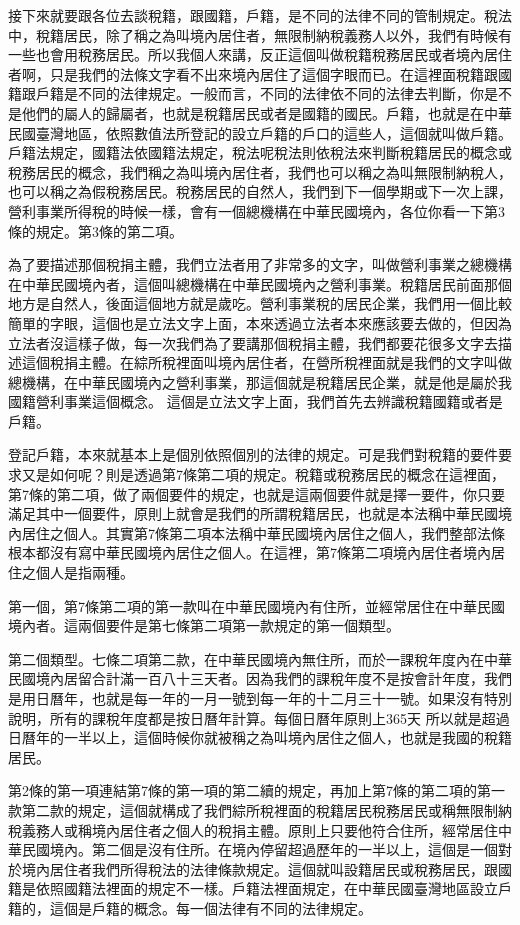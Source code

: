 \documentclass[]{ctexbook}
\begin{document}
接下來就要跟各位去談稅籍，跟國籍，戶籍，是不同的法律不同的管制規定。稅法中，稅籍居民，除了稱之為叫境內居住者，無限制納稅義務人以外，我們有時候有一些也會用稅務居民。所以我個人來講，反正這個叫做稅籍稅務居民或者境內居住者啊，只是我們的法條文字看不出來境內居住了這個字眼而已。在這裡面稅籍跟國籍跟戶籍是不同的法律規定。一般而言，不同的法律依不同的法律去判斷，你是不是他們的屬人的歸屬者，也就是稅籍居民或者是國籍的國民。戶籍，也就是在中華民國臺灣地區，依照數值法所登記的設立戶籍的戶口的這些人，這個就叫做戶籍。戶籍法規定，國籍法依國籍法規定，稅法呢稅法則依稅法來判斷稅籍居民的概念或稅務居民的概念，我們稱之為叫境內居住者，我們也可以稱之為叫無限制納稅人，也可以稱之為假稅務居民。稅務居民的自然人，我們到下一個學期或下一次上課，營利事業所得稅的時候一樣，會有一個總機構在中華民國境內，各位你看一下第3條的規定。第3條的第二項。

為了要描述那個稅捐主體，我們立法者用了非常多的文字，叫做營利事業之總機構在中華民國境內者，這個叫總機構在中華民國境內之營利事業。稅籍居民前面那個地方是自然人，後面這個地方就是歲吃。營利事業稅的居民企業，我們用一個比較簡單的字眼，這個也是立法文字上面，本來透過立法者本來應該要去做的，但因為立法者沒這樣子做，每一次我們為了要講那個稅捐主體，我們都要花很多文字去描述這個稅捐主體。在綜所稅裡面叫境內居住者，在營所稅裡面就是我們的文字叫做總機構，在中華民國境內之營利事業，那這個就是稅籍居民企業，就是他是屬於我國籍營利事業這個概念。
這個是立法文字上面，我們首先去辨識稅籍國籍或者是戶籍。

登記戶籍，本來就基本上是個別依照個別的法律的規定。可是我們對稅籍的要件要求又是如何呢？則是透過第7條第二項的規定。稅籍或稅務居民的概念在這裡面，第7條的第二項，做了兩個要件的規定，也就是這兩個要件就是擇一要件，你只要滿足其中一個要件，原則上就會是我們的所謂稅籍居民，也就是本法稱中華民國境內居住之個人。其實第7條第二項本法稱中華民國境內居住之個人，我們整部法條根本都沒有寫中華民國境內居住之個人。在這裡，第7條第二項境內居住者境內居住之個人是指兩種。

第一個，第7條第二項的第一款叫在中華民國境內有住所，並經常居住在中華民國境內者。這兩個要件是第七條第二項第一款規定的第一個類型。

第二個類型。七條二項第二款，在中華民國境內無住所，而於一課稅年度內在中華民國境內居留合計滿一百八十三天者。因為我們的課稅年度不是按會計年度，我們是用日曆年，也就是每一年的一月一號到每一年的十二月三十一號。如果沒有特別說明，所有的課稅年度都是按日曆年計算。每個日曆年原則上365天 所以就是超過日曆年的一半以上，這個時候你就被稱之為叫境內居住之個人，也就是我國的稅籍居民。

第2條的第一項連結第7條的第一項的第二續的規定，再加上第7條的第二項的第一款第二款的規定，這個就構成了我們綜所稅裡面的稅籍居民稅務居民或稱無限制納稅義務人或稱境內居住者之個人的稅捐主體。原則上只要他符合住所，經常居住中華民國境內。第二個是沒有住所。在境內停留超過歷年的一半以上，這個是一個對於境內居住者我們所得稅法的法律條款規定。這個就叫設籍居民或稅務居民，跟國籍是依照國籍法裡面的規定不一樣。戶籍法裡面規定，在中華民國臺灣地區設立戶籍的，這個是戶籍的概念。每一個法律有不同的法律規定。
\end{document}
